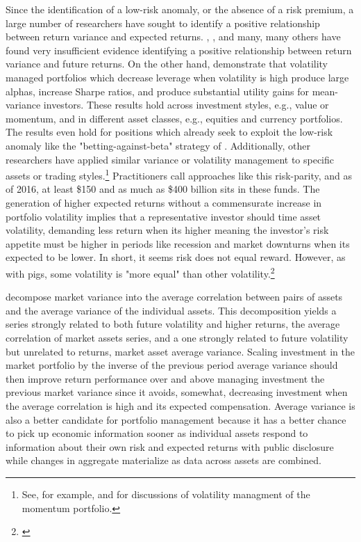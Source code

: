 Since the identification of a low-risk anomaly, or the absence of a risk premium, a large number of researchers have sought to identify a positive relationship between return variance and expected returns. \citet{CAMPBELL1987373}, \cite{FRENCH19873}, \citet{glosten_1993} and many, many others have found very insufficient evidence identifying a positive relationship between return variance and future returns. On the other hand, \citet{moreira_volatility-managed_2017} demonstrate that volatility managed portfolios which decrease leverage when volatility is high produce large alphas, increase Sharpe ratios, and produce substantial utility gains for mean-variance investors. These results hold across investment styles, e.g., value or momentum, and in different asset classes, e.g., equities and currency portfolios. The results even hold for positions which already seek to exploit the low-risk anomaly like the "betting-against-beta" strategy of \citet{frazzini_betting_2014}. Additionally, other researchers have applied similar variance or volatility management to specific assets or trading styles.\footnote{See, for example, \citet{barroso_momentum_2015} and \citet{kim_time_2016} for discussions of volatility managment of the momentum portfolio.} Practitioners call approaches like this risk-parity, and as of 2016, at least \$150 and as much as \$400 billion sits in these funds.\citep{steward_truly_2010,cao_risk_2016} The generation of higher expected returns without a commensurate increase in portfolio volatility implies that a representative investor should time asset volatility, demanding less return when its higher meaning the investor’s risk appetite must be higher in periods like recession and market downturns when its expected to be lower. In short, it seems risk does not equal reward. However, as with pigs, some volatility is "more equal" than other volatility.\footnote{\citep{orwell1946animal}}

\citet{pollet_average_2010} decompose market variance into the average correlation between pairs of assets and the average variance of the individual assets. This decomposition yields a series strongly related to both future volatility and higher returns, the average correlation of market assets series, and a one strongly related to future volatility but unrelated to returns, market asset average variance. Scaling investment in the market portfolio by the inverse of the previous period average variance should then improve return performance over and above managing investment the previous market variance since it avoids, somewhat, decreasing investment when the average correlation is high and its expected compensation. Average variance is also a better candidate for portfolio management because it has a better chance to pick up economic information sooner as individual assets respond to information about their own risk and expected returns with public disclosure while changes in aggregate materialize as data across assets are combined.\citep{campbell1997econometrics,campbell_have_2001} 

